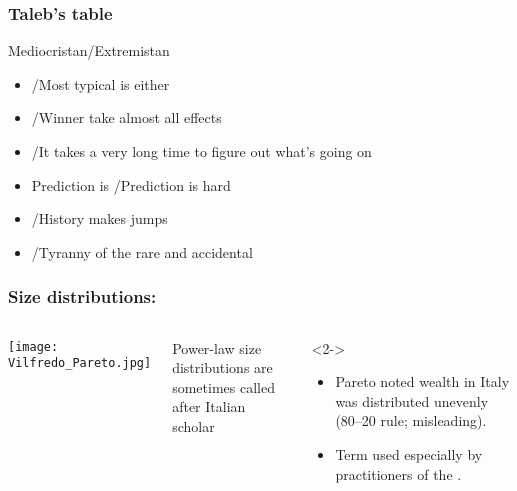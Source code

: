 \begin{frame}
  \frametitle{Taleb's table\cite{taleb2007a}}

{\small
  \begin{block}{Mediocristan/Extremistan}
    \begin{itemize}
    \item<2-> 
       /Most typical is either 
    \item<3-> 
      /Winner take almost all effects 
    \item<4-> 
      /It
      takes a \alert{very long time} to figure out what's going on
    \item<5-> 
      Prediction is /Prediction is \alert{hard}
    \item<6-> 
      /History makes jumps
    \item<7-> 
      /Tyranny of the rare and accidental
    \end{itemize}
  \end{block}
}

\end{frame}

\begin{frame}
  \frametitle{Size distributions:}

  \begin{columns}
    \texttt{[image: Vilfredo\_Pareto.jpg]}
  \begin{block}{}
    Power-law size distributions 
    are sometimes called\\ 
    after Italian scholar 
  \end{block}

  \begin{block}<2->{}
    \begin{itemize}
    \item<2->
      Pareto noted wealth in Italy was distributed unevenly
      (80--20 rule; misleading).
    \item<3->
      Term used especially by practitioners of the 
      .
    \end{itemize}
  \end{block}
  \end{columns}

\end{frame}


